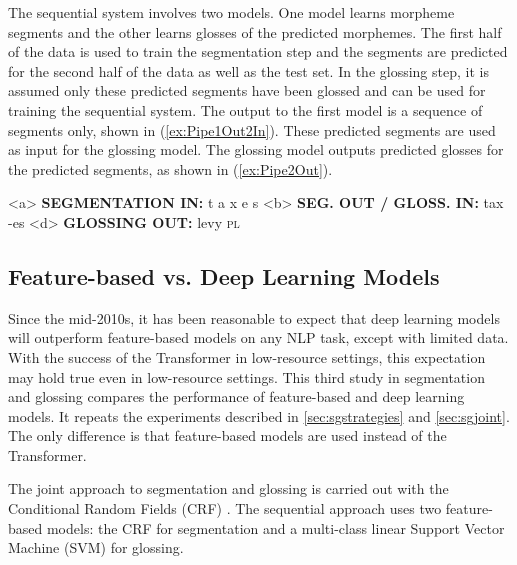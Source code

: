 The sequential system involves two models. One model learns morpheme segments and the other learns glosses of the predicted morphemes. The first half of the data is used to train the segmentation step and the segments are predicted for the second half of the data as well as the test set. In the glossing step, it is assumed only these predicted segments have been glossed and can be used for training the sequential system. The output to the first model is a sequence of segments only, shown in (\ref{ex:Pipe1Out2In}). These predicted segments are used as input for the glossing model. The glossing model outputs predicted glosses for the predicted segments, as shown in (\ref{ex:Pipe2Out}). 

\pex  
\label{ex:Pipe1InOut}
\a<a> \textbf{SEGMENTATION IN:} \hspace{2 mm} t \hspace{2 mm} a \hspace{2 mm} x \hspace{2 mm} e \hspace{2 mm} s 
\label{ex:Pipe1in}
\a<b> \textbf{SEG. OUT / GLOSS. IN:} \hspace{2 mm} tax \hspace{3 mm} -es
\label{ex:Pipe1Out2In}
\a<d> \textbf{GLOSSING OUT:} \hspace{2 mm} levy \hspace{2 mm} \textsc{pl}
\label{ex:Pipe2Out}
\xe

\subsection{Feature-based vs. Deep Learning Models}
\label{sec:CRFvNN}

Since the mid-2010s, it has been reasonable to expect that deep learning models will outperform feature-based models on any NLP task, except with limited data. With the success of the Transformer \citep{vaswani_attention_2017} in low-resource settings, this expectation may hold true even in low-resource settings. This third study in segmentation and glossing compares the performance of feature-based and deep learning models. It repeats the experiments described in \autoref{sec:sgstrategies} and \autoref{sec:sgjoint}. The only difference is that feature-based models are used instead of the Transformer.

The joint approach to segmentation and glossing is carried out with the Conditional Random Fields (CRF) \citep{lafferty_conditional_2001}. The sequential approach uses two feature-based models: the CRF for segmentation and a multi-class linear Support Vector Machine (SVM) for glossing. 

